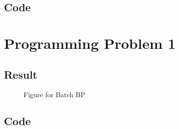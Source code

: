 \documentclass[]{article}
\begin{document}
    \subsection{Code}
    
    
    \section{Programming Problem 1}
    \subsection{Result}
    \begin{figure}[H]
        \centering
        \caption{Figure for Batch BP}
    \end{figure}
    \subsection{Code}
    
\end{document}
